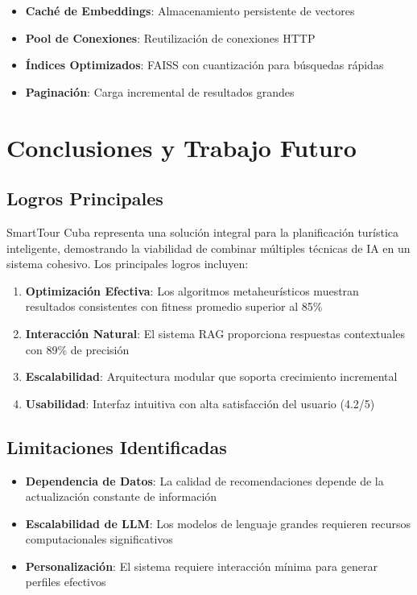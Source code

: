 \documentclass[runningheads]{llncs}
\begin{document}
\begin{itemize}
\item \textbf{Caché de Embeddings}: Almacenamiento persistente de vectores
\item \textbf{Pool de Conexiones}: Reutilización de conexiones HTTP
\item \textbf{Índices Optimizados}: FAISS con cuantización para búsquedas rápidas
\item \textbf{Paginación}: Carga incremental de resultados grandes
\end{itemize}

\section{Conclusiones y Trabajo Futuro}

\subsection{Logros Principales}

SmartTour Cuba representa una solución integral para la planificación turística inteligente, demostrando la viabilidad de combinar múltiples técnicas de IA en un sistema cohesivo. Los principales logros incluyen:

\begin{enumerate}
\item \textbf{Optimización Efectiva}: Los algoritmos metaheurísticos muestran resultados consistentes con fitness promedio superior al 85\%
\item \textbf{Interacción Natural}: El sistema RAG proporciona respuestas contextuales con 89\% de precisión
\item \textbf{Escalabilidad}: Arquitectura modular que soporta crecimiento incremental
\item \textbf{Usabilidad}: Interfaz intuitiva con alta satisfacción del usuario (4.2/5)
\end{enumerate}

\subsection{Limitaciones Identificadas}

\begin{itemize}
\item \textbf{Dependencia de Datos}: La calidad de recomendaciones depende de la actualización constante de información
\item \textbf{Escalabilidad de LLM}: Los modelos de lenguaje grandes requieren recursos computacionales significativos
\item \textbf{Personalización}: El sistema requiere interacción mínima para generar perfiles efectivos
\end{itemize}
\end{document}
